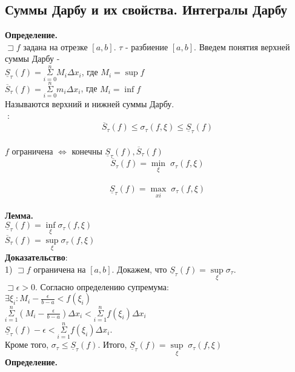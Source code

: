 \documentclass[14pt]{article}
\begin{document}
	\subsection{Суммы Дарбу и их свойства. Интегралы Дарбу}
	\textbf{Определение.} \\
	$\sqsupset f$ задана на отрезке $[a,b]$.  $\tau$ - разбиение $[a,b]$. Введем понятия верхней суммы Дарбу -  \\
	$\underline{S}_{\tau}(f) = \underset{i=0}{\overset{n}{\Sigma}}M_i\Delta x_i$, где $M_i = \sup f$  \\
	$\overline{S}_{\tau}(f)=\underset{i=0}{\overset{n}{\Sigma}}m_i\Delta x_i$, где $M_i = \inf f$ \\
	Называются верхний и нижней суммы Дарбу. \\
	 $\;$: \\ $$\boxed{\overline{S}_{\tau}(f)\leqslant\sigma_{\tau}(f,\xi) \leqslant \underline{S}_{\tau}(f)} $$ \\
	$f$ ограничена $\iff$ конечны $\underline{S}_{\tau}(f),\overline{S}_{\tau}(f)$ \\
	$$\boxed{\overline{S}_{\tau}(f) = \underset{\xi}{\min} \; \sigma_{\tau}(f,\xi)}$$\\
	$$\boxed{\underline{S}_{\tau}(f) = \underset{xi}{\max} \; \sigma_{\tau}(f,\xi)}$$ \\
	\textbf{Лемма.} \\
	$\underline{S}_{\tau}(f) = \underset{\xi}{\inf}\sigma_{\tau}(f,\xi)$ \\
	$\overline{S}_{\tau}(f)=\underset{\xi}{\sup} \sigma_{\tau}(f,\xi)$ \\
	\textbf{Доказательство}: \\
	1) $\sqsupset f$ ограничена на $[a,b]$. Докажем, что $\underline{S}_{\tau}(f)= \underset{\xi}{\sup}\sigma_{\tau}$. \\
	$\sqsupset \epsilon>0.$ Согласно определению супремума: \\
	$\exists \xi_i:M_i-\frac{\epsilon}{b-a}<f(\xi_i)$ \\
	$\underset{i=1}{\overset{n}{\Sigma}}(M_i-\frac{\epsilon}{b-a})\Delta x_i < \underset{i=1}{\overset{n}{\Sigma}} f(\xi_i)\Delta x_i$  \\
	$\underline{S}_{\tau}(f)-\epsilon<\underset{i=1}{\overset{n}{\Sigma}}f(\xi_i)\Delta x_i$. \\
	Кроме того, $\sigma_{\tau} \leqslant \underline{S}_{\tau}(f)$. Итого, $\underline{S}_{\tau}(f)=\underset{\xi}{\sup}\; \sigma_{\tau}(f,\xi)$ \\
	\textbf{Определение.} \\
\end{document}

